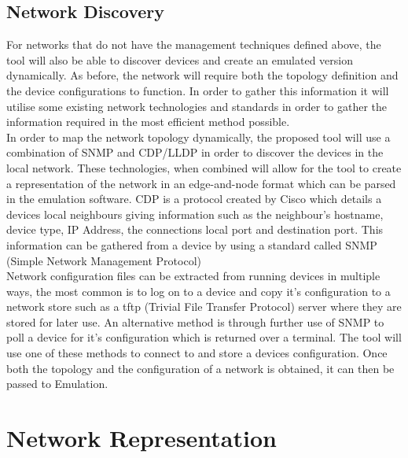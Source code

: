 \documentclass[11pt]{report}
\begin{document}
\subsection{Network Discovery}

For networks that do not have the management techniques defined above, the tool will also be able to discover devices and create an emulated version dynamically. As before, the network will require both the topology definition and the device configurations to function. In order to gather this information it will utilise some existing network technologies and standards in order to gather the information required in the most efficient method possible.
\\
In order to map the network topology dynamically, the proposed tool will use a combination of SNMP and CDP/LLDP in order to discover the devices in the local network. These technologies, when combined will allow for the tool to create a representation of the network in an edge-and-node format which can be parsed in the emulation software. CDP is a protocol created by Cisco which details a devices local neighbours giving information such as the neighbour's hostname, device type, IP Address, the connections local port and destination port. This information can be gathered from a device by using a standard called SNMP (Simple Network Management Protocol)
\\
Network configuration files can be extracted from running devices in multiple ways, the most common is to log on to a device and copy it's configuration to a network store such as a tftp (Trivial File Transfer Protocol) server where they are stored for later use. An alternative method is through further use of SNMP to poll a device for it's configuration which is returned over a terminal. The tool will use one of these methods to connect to and store a devices configuration. Once both the topology and the configuration of a network is obtained, it can then be passed to Emulation.

\section{Network Representation}
\end{document}
